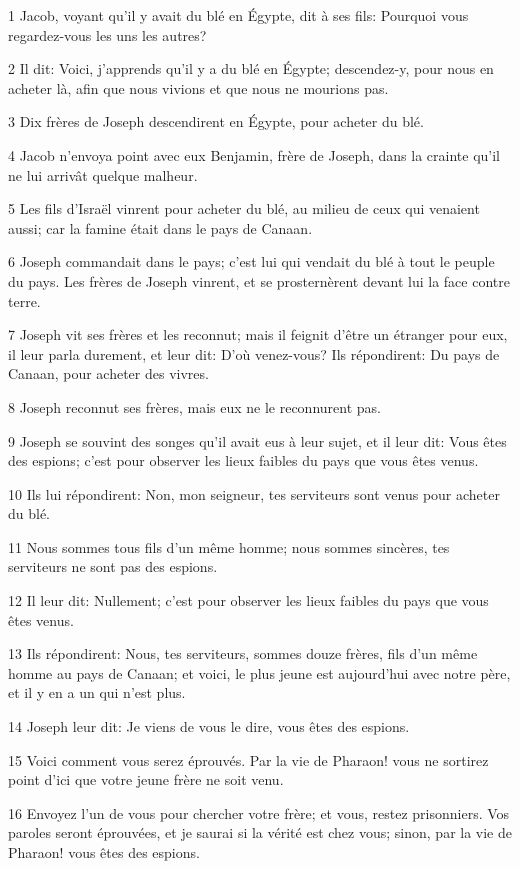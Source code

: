 \par 1 Jacob, voyant qu'il y avait du blé en Égypte, dit à ses fils: Pourquoi vous regardez-vous les uns les autres?
\par 2 Il dit: Voici, j'apprends qu'il y a du blé en Égypte; descendez-y, pour nous en acheter là, afin que nous vivions et que nous ne mourions pas.
\par 3 Dix frères de Joseph descendirent en Égypte, pour acheter du blé.
\par 4 Jacob n'envoya point avec eux Benjamin, frère de Joseph, dans la crainte qu'il ne lui arrivât quelque malheur.
\par 5 Les fils d'Israël vinrent pour acheter du blé, au milieu de ceux qui venaient aussi; car la famine était dans le pays de Canaan.
\par 6 Joseph commandait dans le pays; c'est lui qui vendait du blé à tout le peuple du pays. Les frères de Joseph vinrent, et se prosternèrent devant lui la face contre terre.
\par 7 Joseph vit ses frères et les reconnut; mais il feignit d'être un étranger pour eux, il leur parla durement, et leur dit: D'où venez-vous? Ils répondirent: Du pays de Canaan, pour acheter des vivres.
\par 8 Joseph reconnut ses frères, mais eux ne le reconnurent pas.
\par 9 Joseph se souvint des songes qu'il avait eus à leur sujet, et il leur dit: Vous êtes des espions; c'est pour observer les lieux faibles du pays que vous êtes venus.
\par 10 Ils lui répondirent: Non, mon seigneur, tes serviteurs sont venus pour acheter du blé.
\par 11 Nous sommes tous fils d'un même homme; nous sommes sincères, tes serviteurs ne sont pas des espions.
\par 12 Il leur dit: Nullement; c'est pour observer les lieux faibles du pays que vous êtes venus.
\par 13 Ils répondirent: Nous, tes serviteurs, sommes douze frères, fils d'un même homme au pays de Canaan; et voici, le plus jeune est aujourd'hui avec notre père, et il y en a un qui n'est plus.
\par 14 Joseph leur dit: Je viens de vous le dire, vous êtes des espions.
\par 15 Voici comment vous serez éprouvés. Par la vie de Pharaon! vous ne sortirez point d'ici que votre jeune frère ne soit venu.
\par 16 Envoyez l'un de vous pour chercher votre frère; et vous, restez prisonniers. Vos paroles seront éprouvées, et je saurai si la vérité est chez vous; sinon, par la vie de Pharaon! vous êtes des espions.
